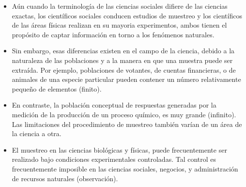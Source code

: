 \documentclass[
  10pt,
  ignorenonframetext,
]{beamer}
\begin{document}
\begin{frame}{}
\protect\hypertarget{section}{}
\begin{itemize}
\item
  Aún cuando la terminología de las ciencias sociales difiere de las
  ciencias exactas, los científicos sociales conducen estudios de
  muestreo y los científicos de las áreas físicas realizan en su mayoria
  experimentos, ambos tienen el propósito de captar información en torno
  a los fenómenos naturales.
\item
  Sin embargo, esas diferencias existen en el campo de la ciencia,
  debido a la naturaleza de las poblaciones y a la manera en que una
  muestra puede ser extraída. Por ejemplo, poblaciones de votantes, de
  cuentas financieras, o de animales de una especie particular pueden
  contener un número relativamente pequeño de elementos (finito).
\item
  En contraste, la población conceptual de respuestas generadas por la
  medición de la producción de un proceso químico, es muy grande
  (infinito). Las limitaciones del procedimiento de muestreo también
  varían de un área de la ciencia a otra.
\item
  El muestreo en las ciencias biológicas y físicas, puede frecuentemente
  ser realizado bajo condiciones experimentales controladas. Tal control
  es frecuentemente imposible en las ciencias sociales, negocios, y
  administración de recursos naturales (observación).
\end{itemize}
\end{frame}
\end{document}
